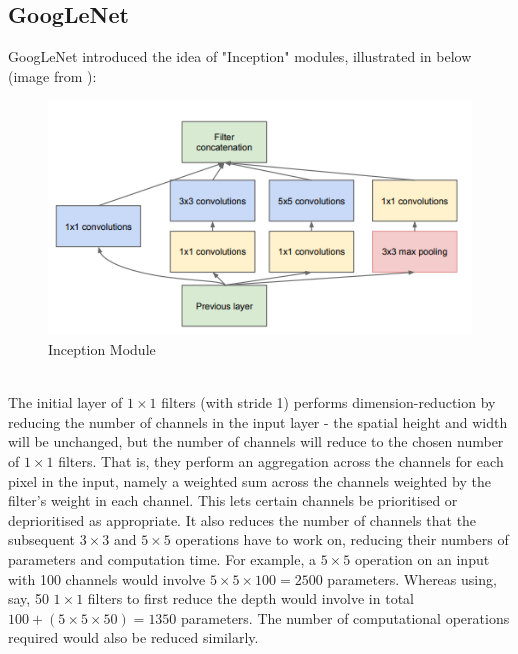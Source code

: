 \documentclass[11pt]{article} %
\theoremstyle{plain}
\theoremstyle{definition}
\begin{document}
\subsection{GoogLeNet}
GoogLeNet \cite{GoogLeNet_Paper} introduced the idea of "Inception" modules, illustrated in  below (image from \cite{GoogLeNet_Paper}):
\begin{figure}[!ht]
  \centering    
  \caption{Inception Module}
  \label{fig:Inception_Module}
  \includegraphics[scale=0.7]{InceptionModule.PNG}
\end{figure}
\\
\noindent
The initial layer of \(1 \times 1\) filters (with stride 1) performs dimension-reduction by reducing the number of channels in the input layer - the spatial height and width will be unchanged, but the number of channels will reduce to the chosen number of \(1 \times 1\) filters. That is, they perform an aggregation across the channels for each pixel in the input, namely a weighted sum across the channels weighted by the filter's weight in each channel. This lets certain channels be prioritised or deprioritised as appropriate. It also reduces the number of channels that the subsequent \(3 \times 3\) and \(5 \times 5\) operations have to work on, reducing their numbers of parameters and computation time. For example, a \(5 \times 5\) operation on an input with 100 channels would involve \(5 \times 5 \times 100 = 2500\) parameters. Whereas using, say, 50 \(1 \times 1\) filters to first reduce the depth would involve in total \(100 + (5 \times 5 \times 50) = 1350\) parameters. The number of computational operations required would also be reduced similarly.
\\
\\
\noindent
\end{document}
